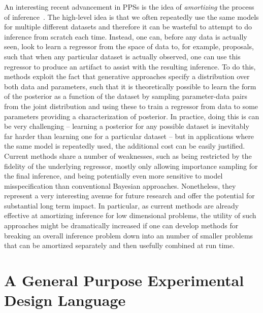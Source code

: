 An interesting recent advancement in PPSs is the idea of \emph{amortizing} the process of 
inference~\citep{paige2016inference,ritchie2016deep,le2017inference}.  The  high-level idea is that  
we often repeatedly use the same models for multiple different datasets and therefore
it can be wasteful to attempt to do inference from scratch each time.  Instead, one can, before any data is
actually seen, look to learn a regressor from the space of data to, for example, proposals, such that
when any particular dataset is actually observed, one can use this regressor to produce an
artifact to assist with the resulting inference.  To do this, methods exploit the fact that generative
approaches specify a distribution over both data and parameters, such that it is theoretically possible
to learn the form of the posterior as a function of the dataset by sampling parameter-data pairs from
the joint distribution and using these to train a regressor from data to some parameters providing a characterization of
posterior.  In practice, doing this is can be very challenging -- learning a posterior for any possible
dataset is inevitably far harder than learning one for a particular dataset -- but in applications where
the same model is repeatedly used, the additional cost can be easily justified.  Current methods share
a number of weaknesses, such as being restricted by the fidelity of the underlying regressor, mostly
only allowing importance sampling for the final inference, and being potentially even more sensitive to
model misspecification than conventional Bayesian approaches.  Nonetheless, they represent a very interesting avenue
for future research and offer the potential for substantial long term impact.  In particular, as current methods
are already effective at amortizing inference for low dimensional problems, the utility of such approaches
might be dramatically increased if one can develop methods for breaking an overall inference problem down
into an number of smaller problems that can be amortized separately and then usefully combined at run time.

\section{A General Purpose Experimental Design Language}
\label{sec:disc:design}

